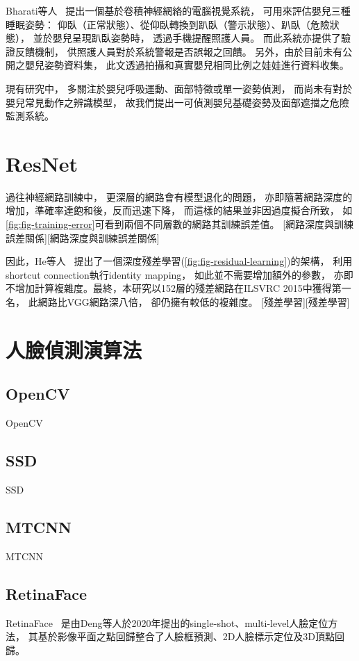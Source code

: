 \documentclass[class=NCU_thesis, crop=false]{standalone}
\begin{document}
Bharati等人~\cite{bharati_efficient_2021}
提出一個基於卷積神經網絡的電腦視覺系統，
可用來評估嬰兒三種睡眠姿勢：
仰臥（正常狀態）、從仰臥轉換到趴臥（警示狀態）、趴臥（危險狀態），
並於嬰兒呈現趴臥姿勢時，
透過手機提醒照護人員。
而此系統亦提供了驗證反饋機制，
供照護人員對於系統警報是否誤報之回饋。
另外，由於目前未有公開之嬰兒姿勢資料集，
此文透過拍攝和真實嬰兒相同比例之娃娃進行資料收集。

現有研究中，
多關注於嬰兒呼吸運動、面部特徵或單一姿勢偵測，
而尚未有對於嬰兒常見動作之辨識模型，
故我們提出一可偵測嬰兒基礎姿勢及面部遮擋之危險監測系統。

\section{ResNet}
過往神經網路訓練中，
更深層的網路會有模型退化的問題，
亦即隨著網路深度的增加，準確率達飽和後，反而迅速下降，
而這樣的結果並非因過度擬合所致，
如\cref{fig:fig-training-error}可看到兩個不同層數的網路其訓練誤差值。
[網路深度與訓練誤差關係][網路深度與訓練誤差關係]

因此，He等人~\cite{he_deep_2016}
提出了一個深度殘差學習(\cref{fig:fig-residual-learning})的架構，
利用shortcut connection執行identity mapping，
如此並不需要增加額外的參數，
亦即不增加計算複雜度。最終，本研究以152層的殘差網路在ILSVRC 2015中獲得第一名，
此網路比VGG網路深八倍，
卻仍擁有較低的複雜度。
[殘差學習][殘差學習]

\section{人臉偵測演算法}
\subsection{OpenCV}
OpenCV
~\cite{goyal_face_2017}

\subsection{SSD}
SSD
~\cite{ye_face_2021}

\subsection{MTCNN}
MTCNN
~\cite{xiang_joint_2017}

\subsection{RetinaFace}
RetinaFace~\cite{deng_retinaface_2020}
是由Deng等人於2020年提出的single-shot、multi-level人臉定位方法，
其基於影像平面之點回歸整合了人臉框預測、2D人臉標示定位及3D頂點回歸。
\end{document}
